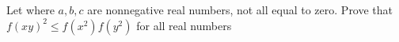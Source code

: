 Let  where $a,b,c$ are nonnegative real numbers, not all equal to zero. Prove that $f(xy)^2\le f(x^2)f(y^2)$ for all real numbers 